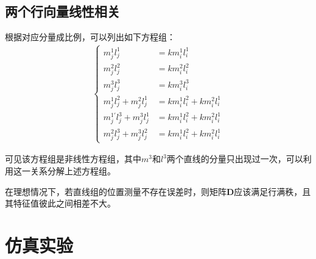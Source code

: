 \documentclass[11pt]{article}
\begin{document}
\subsection{两个行向量线性相关}
根据对应分量成比例，可以列出如下方程组：
\begin{align}
  \left\{
  \begin{aligned}
    m_j^{1}l_j^{1}                  & =km_i^{1}l_i^{1}                 \\
    m_j^{2}l_j^{2}                  & =km_i^{2}l_i^{2}                   \\
    m_j^{3}l_j^{3}                  & =km_i^{3}l_i^{3}                  \\
    m_j^{1}l_j^{2}+m_j^{2}l_j^{1} & =km_i^{1}l_i^{2}+km_i^{2}l_i^{1} \\
    m_j^{1'}l_j^{3}+m_j^{3}l_j^{1} & =km_i^{1}l_i^{2}+km_i^{2}l_i^{1} \\
    m_j^{2}l_j^{3}+m_j^{3}l_j^{2} & =km_i^{1}l_i^{2}+km_i^{2}l_i^{1}
  \end{aligned}
  \right.
\end{align}\par
可见该方程组是非线性方程组，其中$m^3$和$l^3$两个直线的分量只出现过一次，可以利用这一关系分解上述方程组。


在理想情况下，若直线组的位置测量不存在误差时，则矩阵$\mathbf{D}$应该满足行满秩，且其特征值彼此之间相差不大。
\section{仿真实验}
\newpage
\printbibliography[heading=bibliography,title=参考文献]
\end{document}

